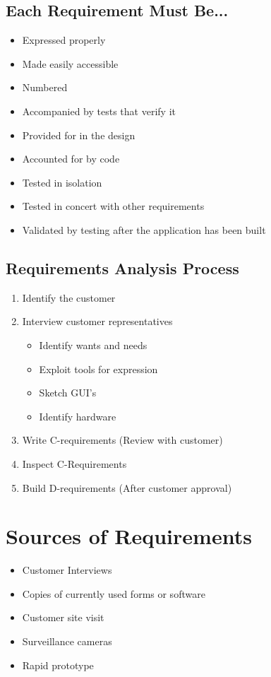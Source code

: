 \documentclass{report}
\begin{document}
			\subsection{Each Requirement Must Be...}
				\begin{itemize}
					\item Expressed properly
					\item Made easily accessible
					\item Numbered
					\item Accompanied by tests that verify it
					\item Provided for in the design
					\item Accounted for by code
					\item Tested in isolation
					\item Tested in concert with other requirements
					\item Validated by testing after the application has been built
				\end{itemize}
			\subsection{Requirements Analysis Process}
				\begin{enumerate}
					\item Identify the customer
					\item Interview customer representatives
						\begin{itemize}
							\item Identify wants and needs
							\item Exploit tools for expression
							\item Sketch GUI's
							\item Identify hardware
						\end{itemize}
					\item Write C-requirements (Review with customer)
					\item Inspect C-Requirements
					\item Build D-requirements (After customer approval)
				\end{enumerate}
		\section{Sources of Requirements}
			\begin{itemize}
				\item Customer Interviews
				\item Copies of currently used forms or software
				\item Customer site visit
				\item Surveillance cameras
				\item Rapid prototype
			\end{itemize}
\end{document}
